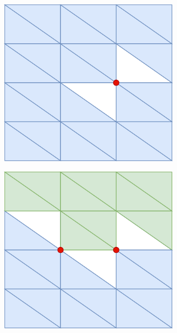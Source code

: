 \begin{figure}[ht]
\begin{subfigure}{.24\linewidth}
    \caption{\label{fig:ch3_NonMainifoldCond1B}}\vspace{6pt}
  \end{subfigure}
  \begin{subfigure}{.24\linewidth}
    \centering\includegraphics[width=.9\linewidth]{chapter_3_polylidar3d/imgs/OPCHalfEdge-ManifoldMeshC.pdf}
    \caption{\label{fig:ch3_NonMainifoldCond1C}}\vspace{6pt}
  \end{subfigure}
  \begin{subfigure}{.24\linewidth}
    \centering\includegraphics[width=.9\linewidth]{chapter_3_polylidar3d/imgs/OPCHalfEdge-ManifoldMeshD.pdf}

\end{subfigure}
\end{figure}
